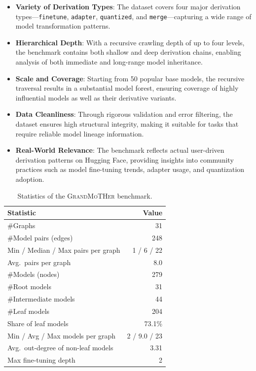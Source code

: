 \begin{itemize}
    \item \textbf{Variety of Derivation Types}: The dataset covers four major derivation types—\texttt{finetune}, \texttt{adapter}, \texttt{quantized}, and \texttt{merge}—capturing a wide range of model transformation patterns.
    
    \item \textbf{Hierarchical Depth}: With a recursive crawling depth of up to four levels, the benchmark contains both shallow and deep derivation chains, enabling analysis of both immediate and long-range model inheritance.
    
    \item \textbf{Scale and Coverage}: Starting from 50 popular base models, the recursive traversal results in a substantial model forest, ensuring coverage of highly influential models as well as their derivative variants.
    
    \item \textbf{Data Cleanliness}: Through rigorous validation and error filtering, the dataset ensures high structural integrity, making it suitable for tasks that require reliable model lineage information.
    
    \item \textbf{Real-World Relevance}: The benchmark reflects actual user-driven derivation patterns on Hugging Face, providing insights into community practices such as model fine-tuning trends, adapter usage, and quantization adoption.
\end{itemize}

\begin{table}[t]
    \centering
    \caption{Statistics of the \textsc{GrandMoTHer} benchmark.}
    \label{tab:grandmother-statistics}
    \small
    \begin{tabular}{l r}
        \toprule
        \textbf{Statistic} & \textbf{Value} \\
        \midrule
        \#Graphs & 31 \\
        \#Model pairs (edges) & 248 \\
        Min / Median / Max pairs per graph & 1 / 6 / 22 \\
        Avg.\ pairs per graph & 8.0 \\
        \#Models (nodes) & 279 \\
        \#Root models & 31 \\
        \#Intermediate models & 44 \\
        \#Leaf models & 204 \\
        Share of leaf models & 73.1\% \\
        Min / Avg / Max models per graph & 2 / 9.0 / 23 \\
        Avg.\ out-degree of non-leaf models & 3.31 \\
        Max fine-tuning depth & 2 \\
        \bottomrule
    \end{tabular}
\end{table}  


